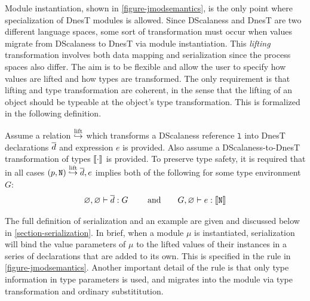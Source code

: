 Module instantiation, shown in \autoref{figure-jmodsemantics}, is the only point where
specialization of DnesT modules is allowed. Since DScalaness and DnesT are two different
language spaces, some sort of transformation must occur when values migrate from DScalaness to
DnesT via module instantiation. This \emph{lifting} transformation involves both data mapping
and serialization since the process spaces also differ. The aim is to be flexible and allow the
user to specify how values are lifted and how types are transformed. The only requirement is
that lifting and type transformation are coherent, in the sense that the lifting of an object
should be typeable at the object's type transformation. This is formalized in the following
definition.
\begin{definition}
\label{def-lifting}
Assume a relation $\overset{\text{lift}}{\hookrightarrow}$ which transforms a DScalaness reference $\texttt{l}$ into DnesT
declarations $\overline{d}$ and expression $e$ is provided. Also assume a DScalaness-to-DnesT
transformation of types $\llbracket \cdot \rrbracket$ is provided. To preserve type safety, it is required that
in all cases $\mathtt{(}p,\mathtt{N)} \overset{\text{lift}}{\hookrightarrow} \overline{d}, e$ implies both of the following for some type
environment $G$:
$$
\varnothing, \varnothing \vdash \overline{d} : G \qquad \text{ and} \qquad
 G, \varnothing \vdash e : \llbracket \texttt{N} \rrbracket 
$$
\end{definition}
The full definition of serialization and an example are given and discussed below in
\autoref{section-serialization}. In brief, when a module $\mu$ is instantiated, serialization
will bind the value parameters of $\mu$ to the lifted values of their instances in a series of
declarations that are added to its own. This is specified in the  rule in
\autoref{figure-jmodsemantics}. Another important detail of the  rule is that
only type information in type parameters is used, and migrates into the module via type
transformation and ordinary substititution.

\jmodsemanticsfig

